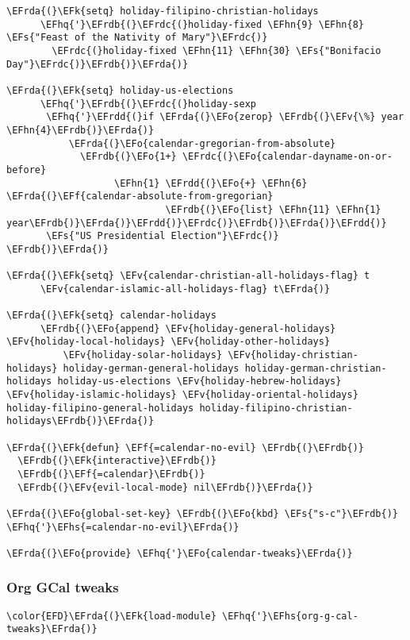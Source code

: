 \documentclass[a4wide,10pt]{article}
\newcommand{\EFs}[1]{\textcolor{EFs}{#1}} %
\newcommand{\EFk}[1]{\textcolor{EFk}{#1}} %
\newcommand{\EFf}[1]{\textcolor{EFf}{#1}} %
\newcommand{\EFv}[1]{\textcolor{EFv}{#1}} %
\newcommand{\EFo}[1]{\textcolor{EFo}{#1}} %
\newcommand{\EFhn}[1]{\textcolor{EFhn}{\textbf{#1}}} %
\newcommand{\EFhq}[1]{\textcolor{EFhq}{#1}} %
\newcommand{\EFhs}[1]{\textcolor{EFhs}{#1}} %
\newcommand{\EFrda}[1]{\textcolor{EFrda}{#1}} %
\newcommand{\EFrdb}[1]{\textcolor{EFrdb}{#1}} %
\newcommand{\EFrdc}[1]{\textcolor{EFrdc}{#1}} %
\newcommand{\EFrdd}[1]{\textcolor{EFrdd}{#1}} %
\begin{document}
\begin{Code}
\begin{Verbatim}
\EFrda{(}\EFk{setq} holiday-filipino-christian-holidays
      \EFhq{'}\EFrdb{(}\EFrdc{(}holiday-fixed \EFhn{9} \EFhn{8} \EFs{"Feast of the Nativity of Mary"}\EFrdc{)}
        \EFrdc{(}holiday-fixed \EFhn{11} \EFhn{30} \EFs{"Bonifacio Day"}\EFrdc{)}\EFrdb{)}\EFrda{)}

\EFrda{(}\EFk{setq} holiday-us-elections
      \EFhq{'}\EFrdb{(}\EFrdc{(}holiday-sexp
       \EFhq{'}\EFrdd{(}if \EFrda{(}\EFo{zerop} \EFrdb{(}\EFv{\%} year \EFhn{4}\EFrdb{)}\EFrda{)}
           \EFrda{(}\EFo{calendar-gregorian-from-absolute}
             \EFrdb{(}\EFo{1+} \EFrdc{(}\EFo{calendar-dayname-on-or-before}
                   \EFhn{1} \EFrdd{(}\EFo{+} \EFhn{6} \EFrda{(}\EFf{calendar-absolute-from-gregorian}
                            \EFrdb{(}\EFo{list} \EFhn{11} \EFhn{1} year\EFrdb{)}\EFrda{)}\EFrdd{)}\EFrdc{)}\EFrdb{)}\EFrda{)}\EFrdd{)}
       \EFs{"US Presidential Election"}\EFrdc{)}
\EFrdb{)}\EFrda{)}

\EFrda{(}\EFk{setq} \EFv{calendar-christian-all-holidays-flag} t
      \EFv{calendar-islamic-all-holidays-flag} t\EFrda{)}

\EFrda{(}\EFk{setq} calendar-holidays
      \EFrdb{(}\EFo{append} \EFv{holiday-general-holidays} \EFv{holiday-local-holidays} \EFv{holiday-other-holidays}
	      \EFv{holiday-solar-holidays} \EFv{holiday-christian-holidays} holiday-german-general-holidays holiday-german-christian-holidays holiday-us-elections \EFv{holiday-hebrew-holidays} \EFv{holiday-islamic-holidays} \EFv{holiday-oriental-holidays} holiday-filipino-general-holidays holiday-filipino-christian-holidays\EFrdb{)}\EFrda{)}

\EFrda{(}\EFk{defun} \EFf{=calendar-no-evil} \EFrdb{(}\EFrdb{)}
  \EFrdb{(}\EFk{interactive}\EFrdb{)}
  \EFrdb{(}\EFf{=calendar}\EFrdb{)}
  \EFrdb{(}\EFv{evil-local-mode} nil\EFrdb{)}\EFrda{)}

\EFrda{(}\EFo{global-set-key} \EFrdb{(}\EFo{kbd} \EFs{"s-c"}\EFrdb{)} \EFhq{'}\EFhs{=calendar-no-evil}\EFrda{)}

\EFrda{(}\EFo{provide} \EFhq{'}\EFo{calendar-tweaks}\EFrda{)}
\end{Verbatim}
\end{Code}
\subsubsection{Org GCal tweaks}
\label{sec:org62a08fc}
\begin{Code}
\begin{Verbatim}
\color{EFD}\EFrda{(}\EFk{load-module} \EFhq{'}\EFhs{org-g-cal-tweaks}\EFrda{)}
\end{Verbatim}
\end{Code}
\end{document}
